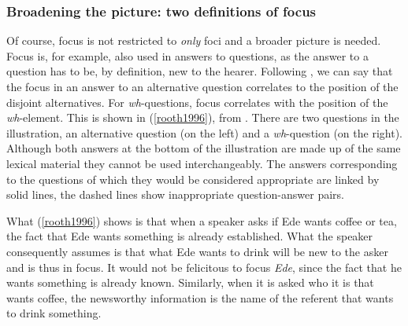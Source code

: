 \subsubsection{Broadening the picture: two definitions of focus}
Of course, focus is not restricted to \textit{only} foci and a broader picture is needed. Focus is, for example, also used in answers to questions, as the answer to a question has to be, by definition, new to the hearer. Following \citet{rooth1996focus}, we can say that the focus in an answer to an alternative question correlates to the position of the disjoint alternatives. For \textit{wh}-questions, focus correlates with the position of the \textit{wh}-element. This is shown in (\ref{rooth1996}), from \citet{rooth1996focus}. There are two questions in the illustration, an alternative question (on the left) and a \textit{wh}-question (on the right). Although both answers at the bottom of the illustration are made up of the same lexical material they cannot be used interchangeably. The answers corresponding to the questions of which they would be considered appropriate are linked by solid lines, the dashed lines show inappropriate question-answer pairs. 

\begin{exe}
\ex\label{rooth1996} 
{}
\end{exe}

\noindent What (\ref{rooth1996}) shows is that when a speaker asks if Ede wants coffee or tea, the fact that Ede wants something is already established. What the speaker consequently assumes is that what Ede wants to drink will be new to the asker and is thus in focus. It would not be felicitous to focus \textit{Ede}, since the fact that he wants something is already known. Similarly, when it is asked who it is that wants coffee, the newsworthy information is the name of the referent that wants to drink something. 

